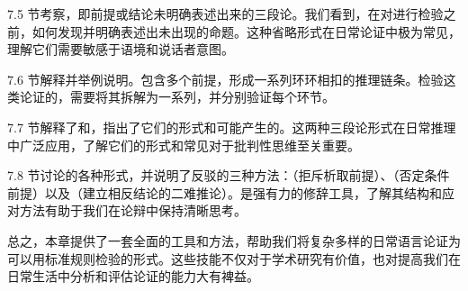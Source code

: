 7.5 节考察，即前提或结论未明确表述出来的三段论。我们看到，在对进行检验之前，如何发现并明确表述出未出现的命题。这种省略形式在日常论证中极为常见，理解它们需要敏感于语境和说话者意图。

7.6 节解释并举例说明。包含多个前提，形成一系列环环相扣的推理链条。检验这类论证的，需要将其拆解为一系列，并分别验证每个环节。

7.7 节解释了和，指出了它们的形式和可能产生的。这两种三段论形式在日常推理中广泛应用，了解它们的形式和常见对于批判性思维至关重要。

7.8 节讨论的各种形式，并说明了反驳的三种方法：（拒斥析取前提）、（否定条件前提）以及（建立相反结论的二难推论）。是强有力的修辞工具，了解其结构和应对方法有助于我们在论辩中保持清晰思考。

总之，本章提供了一套全面的工具和方法，帮助我们将复杂多样的日常语言论证为可以用标准规则检验的形式。这些技能不仅对于学术研究有价值，也对提高我们在日常生活中分析和评估论证的能力大有裨益。

